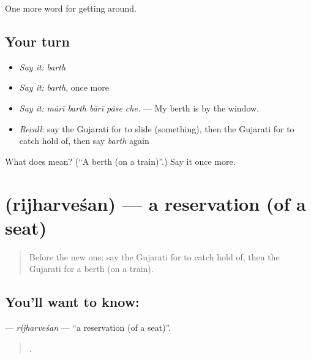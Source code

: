 \begin{grammarlens}[title={What you've built}]
One more word for getting around.
\end{grammarlens}

\subsection*{Your turn}
\begin{itemize}
\raggedright
  \item \emph{Say it:} \emph{barth}
  \item \emph{Say it:} \emph{barth}, once more
  \item \emph{Say it:} \emph{mārī barth bārī pāse che.} — My berth is by the window.
  \item \emph{Recall:} say the Gujarati for to slide (something), then the Gujarati for to catch hold of, then say \emph{barth} again
\end{itemize}

\begin{tcolorbox}[breakable,colback=teal!4,colframe=teal!35!black,title={Before you move on}]
What does  mean? (\textquotedblleft{}A berth (on a train)\textquotedblright{}.) Say it once more.
\end{tcolorbox}
\section[\texorpdfstring{\gu{રિઝર્વેશન} (rijharveśan)}{રિઝર્વેશન (rijharveśan)}]{ (rijharveśan) — a reservation (of a seat)}

\label{lesson:GU-C395-rijharvesan}



\begin{quote}
Before the new one: say the Gujarati for to catch hold of, then the Gujarati for a berth (on a train).
\end{quote}

\subsection*{You'll want to know: }
\textbf{} — \emph{rijharveśan} — \textquotedblleft{}a reservation (of a seat)\textquotedblright{}.

\begin{quote}
      .
\end{quote}

